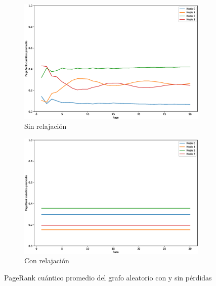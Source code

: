 \begin{figure}[H]
    \centering
    \begin{subfigure}[m]{0.45\textwidth}
        \centering
        \includegraphics[width=0.9\linewidth]{img/any-mean-lossless.eps}
        \caption{Sin relajación}
    \end{subfigure}
    \begin{subfigure}[m]{0.45\textwidth}
        \centering
        \includegraphics[width=0.9\linewidth]{img/any-mean-lossy.eps}
        \caption{Con relajación}
    \end{subfigure}
    \caption[PageRank cuántico promedio del grafo aleatorio con y sin pérdidas]{PageRank cuántico promedio del grafo aleatorio con y sin pérdidas}
    \label{fig:meananylossy}
\end{figure}



